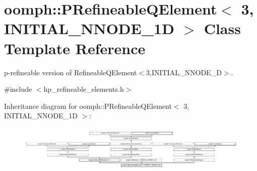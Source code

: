 \hypertarget{classoomph_1_1PRefineableQElement_3_013_00_01INITIAL__NNODE__1D_01_4}{}\section{oomph\+:\+:P\+Refineable\+Q\+Element$<$ 3, I\+N\+I\+T\+I\+A\+L\+\_\+\+N\+N\+O\+D\+E\+\_\+1D $>$ Class Template Reference}
\label{classoomph_1_1PRefineableQElement_3_013_00_01INITIAL__NNODE__1D_01_4}


p-\/refineable version of Refineable\+Q\+Element$<$3,\+I\+N\+I\+T\+I\+A\+L\+\_\+\+N\+N\+O\+D\+E\+\_\+D$>$.  




{\ttfamily \#include $<$hp\+\_\+refineable\+\_\+elements.\+h$>$}

Inheritance diagram for oomph\+:\+:P\+Refineable\+Q\+Element$<$ 3, I\+N\+I\+T\+I\+A\+L\+\_\+\+N\+N\+O\+D\+E\+\_\+1D $>$\+:\begin{figure}[H]
\begin{center}
\leavevmode
\includegraphics[height=2.299120cm]{classoomph_1_1PRefineableQElement_3_013_00_01INITIAL__NNODE__1D_01_4}
\end{center}
\end{figure}
